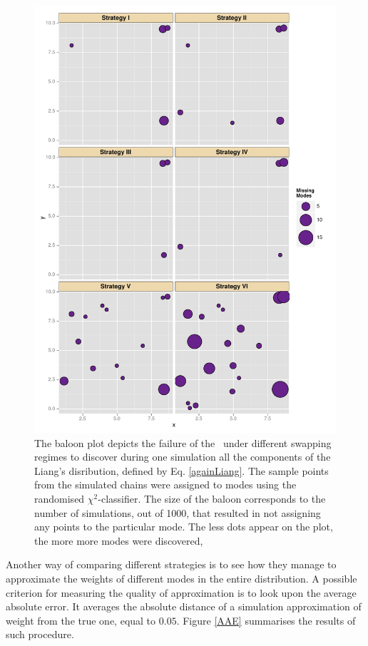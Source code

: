 \documentclass{book}
\begin{document}
\begin{figure}[ht]
	\centering \includegraphics[height=.7\textheight,keepaspectratio=TRUE]{./img/ggplotMissingModes.pdf}
	\caption{
		The baloon plot depicts the failure of the \PT\, under different swapping regimes to discover during one simulation all the components of the Liang's disribution, defined by Eq. \ref{againLiang}. The sample points from the simulated chains were assigned to modes using the randomised $\chi^2$-classifier. The size of the baloon corresponds to the number of simulations, out of 1000, that resulted in not assigning any points to the particular mode. The less dots appear on the plot, the more more modes were discovered, 
	}\label{missingModes}
\end{figure}

Another way of comparing different strategies is to see how they manage to approximate the weights of different modes in the entire distribution. A possible criterion for measuring the quality of approximation is to look upon the average absolute error. It averages the absolute distance of a simulation approximation of weight from the true one, equal to $0.05$. Figure \ref{AAE} summarises the results of such procedure.
\end{document}
